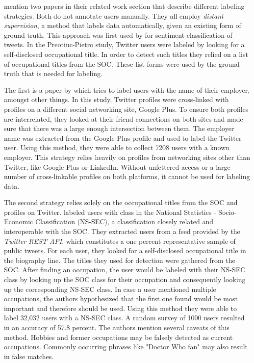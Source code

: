 \documentclass[
10pt, %
a4paper, %
oneside, %
headinclude,footinclude, %
] {book}%
\begin{document}
\citet{pietro} mention two papers in their related work section that describe different labeling strategies. Both do not annotate users manually. They all employ \textit{distant supervision}, a method that labels data automatically, given an existing form of ground truth. This approach was first used by \citet{distantsupervision} for sentiment classification of tweets. In the Preotiuc-Pietro study, Twitter users were labeled by looking for a self-disclosed occupational title. In order to detect such titles they relied on a list of occupational titles from the SOC. These list forms were used by the ground truth that is needed for labeling.

The first is a paper by \citet{li} which tries to label users with the name of their employer, amongst other things. In this study, Twitter profiles were cross-linked with profiles on a different social networking site, Google Plus. To ensure both profiles are interrelated, they looked at their friend connections on both sites and made sure that there was a large enough intersection between them. The employer name was extracted from the Google Plus profile and used to label the Twitter user. Using this method, they were able to collect 7208 users with a known employer. 
This strategy relies heavily on profiles from networking sites other than Twitter, like Google Plus or LinkedIn. Without unfettered access or a large number of cross-linkable profiles on both platforms, it cannot be used for labeling data.

The second strategy relies solely on the occupational titles from the SOC and profiles on Twitter. \citet{sloan} labeled users with class in the National Statistics - Socio-Economic Classification (NS-SEC), a classification closely related and interoperable with the SOC. 
They extracted users from a feed provided by the \textit{Twitter REST API}, which constitutes a one percent representative sample of public tweets. For each user, they looked for a self-disclosed occupational title in the biography line. The titles they used for detection were gathered from the SOC. After finding an occupation, the user would be labeled with their NS-SEC class by looking up the SOC class for their occupation and consequently looking up the corresponding NS-SEC class. In case a user mentioned multiple occupations, the authors hypothesized that the first one found would be most important and therefore should be used. 
Using this method they were able to label 32,032 users with a NS-SEC class. A random survey of 1000 users resulted in an accuracy of 57.8 percent. The authors mention several caveats of this method. Hobbies and former occupations may be falsely detected as current occupations. Commonly occurring phrases like "Doctor Who fan" may also result in false matches.
\end{document}
